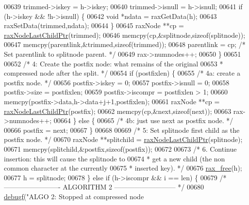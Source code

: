 \begin{DoxyCode}
{{{{{{{{{{00639             trimmed->iskey = h->iskey;
00640             trimmed->isnull = h->isnull;
00641             \textcolor{keywordflow}{if} (h->iskey && !h->isnull) \{
00642                 \textcolor{keywordtype}{void} *ndata = raxGetData(h);
00643                 raxSetData(trimmed,ndata);
00644             \}
00645             raxNode **cp = \hyperlink{rax_8c_a2c5310b0d00672508a8f935a7109f4ce}{raxNodeLastChildPtr}(trimmed);
00646             memcpy(cp,&splitnode,\textcolor{keyword}{sizeof}(splitnode));
00647             memcpy(parentlink,&trimmed,\textcolor{keyword}{sizeof}(trimmed));
00648             parentlink = cp; \textcolor{comment}{/* Set parentlink to splitnode parent. */}
00649             rax->numnodes++;
00650         \}
00651 
00652         \textcolor{comment}{/* 4: Create the postfix node: what remains of the original}
00653 \textcolor{comment}{         * compressed node after the split. */}
00654         \textcolor{keywordflow}{if} (postfixlen) \{
00655             \textcolor{comment}{/* 4a: create a postfix node. */}
00656             postfix->iskey = 0;
00657             postfix->isnull = 0;
00658             postfix->size = postfixlen;
00659             postfix->iscompr = postfixlen > 1;
00660             memcpy(postfix->data,h->data+j+1,postfixlen);
00661             raxNode **cp = \hyperlink{rax_8c_a2c5310b0d00672508a8f935a7109f4ce}{raxNodeLastChildPtr}(postfix);
00662             memcpy(cp,&next,\textcolor{keyword}{sizeof}(next));
00663             rax->numnodes++;
00664         \} \textcolor{keywordflow}{else} \{
00665             \textcolor{comment}{/* 4b: just use next as postfix node. */}
00666             postfix = next;
00667         \}
00668 
00669         \textcolor{comment}{/* 5: Set splitnode first child as the postfix node. */}
00670         raxNode **splitchild = \hyperlink{rax_8c_a2c5310b0d00672508a8f935a7109f4ce}{raxNodeLastChildPtr}(splitnode);
00671         memcpy(splitchild,&postfix,\textcolor{keyword}{sizeof}(postfix));
00672 
00673         \textcolor{comment}{/* 6. Continue insertion: this will cause the splitnode to}
00674 \textcolor{comment}{         * get a new child (the non common character at the currently}
00675 \textcolor{comment}{         * inserted key). */}
00676         \hyperlink{rax__malloc_8h_a3adfa16bca6cd23b6e125fd441465e49}{rax\_free}(h);
00677         h = splitnode;
00678     \} \textcolor{keywordflow}{else} \textcolor{keywordflow}{if} (h->iscompr && i == len) \{
00679     \textcolor{comment}{/* ------------------------- ALGORITHM 2 --------------------------- */}
00680         \hyperlink{rax_8c_a10b215c81aa397dbc44adfb3e436befb}{debugf}(\textcolor{stringliteral}{"ALGO 2: Stopped at compressed node %
}}}}}}}}}}}
\end{DoxyCode}
